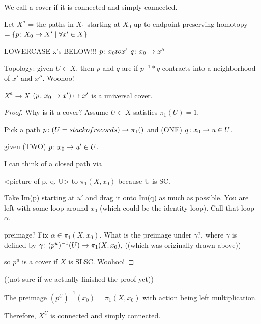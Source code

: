 \documentclass[11pt,leqno,oneside]{amsart}
\newenvironment{dateenv}{
  \vspace{1em}
}{
  \vspace{1em}
}
\newcommand{\mydate}[4]{
  \newdate{#1}{#2}{#3}{#4}
  \begin{dateenv}
    \hfill\displaydate{#1}
  \end{dateenv}
}
\numberwithin{thm}{section}
\newcommand{\fund}[1][1]{\pi_{#1}}
\begin{document}
\begin{defn}
  We call a cover  if it is connected and simply connected.
\end{defn}

Let $X^a$ = {the paths in $X_1$ starting at $X_0$ up to endpoint preserving homotopy }
$= \{ p \colon X_0 \to X' \mid \forall x' \in X \}$

LOWERCASE x's BELOW!!!
$p \colon x_0 to x'$
$q \colon x_0 \to x''$

\begin{defn}
  Topology: given $U \subset X$, then $p$ and $q$ are  if $p^{-1}*q$ contracts into a neighborhood of $x'$ and $x''$.  Woohoo!
\end{defn}

\begin{thm}
  $X^a \to X$
  $(p \colon x_0 \to x') \mapsto x'$
  is a universal cover.
\end{thm}
\begin{proof}
  Why is it a cover?  Assume $U \subset X$ satisfies $\fund(U) = 1$.

  Pick a path $p \from (U = stack of records) \to \fund()$ and (ONE) $q \colon x_0 \to u \in U$.

  given (TWO) $p \colon x_0 \to u' \in U$.

  I can think of a closed path via

  <picture of p, q, U> to $\fund(X, x_0)$
  because U is SC.

  Take Im(p) starting at $u'$ and drag it onto Im(q) as much as possible.  You are left with some loop around $x_0$ (which could be the identity loop).  Call that loop $\alpha$.

  preimage?  Fix $\alpha \in \fund(X, x_0)$.  What is the preimage under $\gamma$?, where $\gamma$ is defined by $\gamma \from (p^u)^{-1}(U) \to \fund(X, x_0)$, ((which was originally drawn above))

  so $p^u$ is a cover if $X$ is SLSC.  Woohoo!
\end{proof}
((not sure if we actually finished the proof yet))

The preimage $(p^U)^{-1}(x_0) = \fund(X, x_0)$ with action being left multiplication.

Therefore, $X^U$ is connected and simply connected.

\mydate{d6}{3}{2}{2017}
\end{document}

